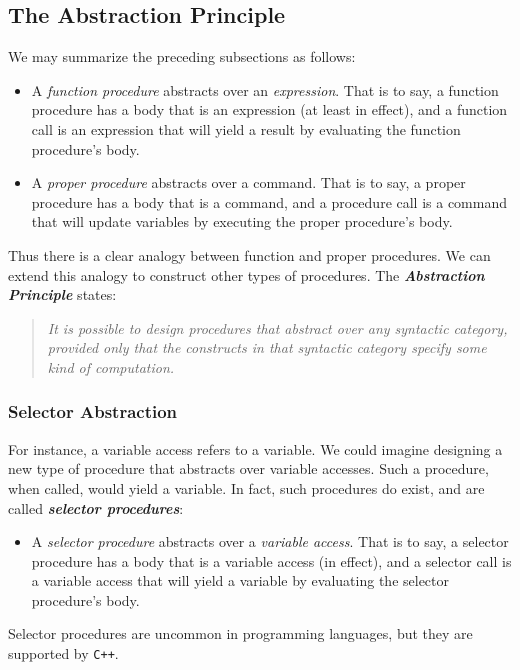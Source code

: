\subsection{The Abstraction Principle}

We may summarize the preceding subsections as follows:
\begin{itemize}
  \item A \textit{function procedure} abstracts over an \textit{expression}. That is to say, a function procedure has a body that is an expression (at least in effect), and a function call is an expression that will yield a result by evaluating the function procedure's body.
  \item A \textit{proper procedure} abstracts over a command. That is to say, a proper procedure has a body that is a command, and a procedure call is a command that will update variables by executing the proper procedure's body.
\end{itemize}

Thus there is a clear analogy between function and proper procedures. We can extend this analogy to construct other types of procedures. The \textit{\textbf{Abstraction Principle}} states:
\begin{quote}
  \textit{It is possible to design procedures that abstract over any syntactic category, provided only that the constructs in that syntactic category specify some kind of computation.}
\end{quote}

\subsubsection{Selector Abstraction}

For instance, a variable access refers to a variable. We could imagine designing a new type of procedure that abstracts over variable accesses. Such a procedure, when called, would yield a variable. In fact, such procedures do exist, and are called \textit{\textbf{selector procedures}}:
\begin{itemize}
  \item A \textit{selector procedure} abstracts over a \textit{variable access}. That is to say, a selector procedure has a body that is a variable access (in effect), and a selector call is a variable access that will yield a variable by evaluating the selector procedure’s body.
\end{itemize}
Selector procedures are uncommon in programming languages, but they are
supported by \texttt{C++}. 

